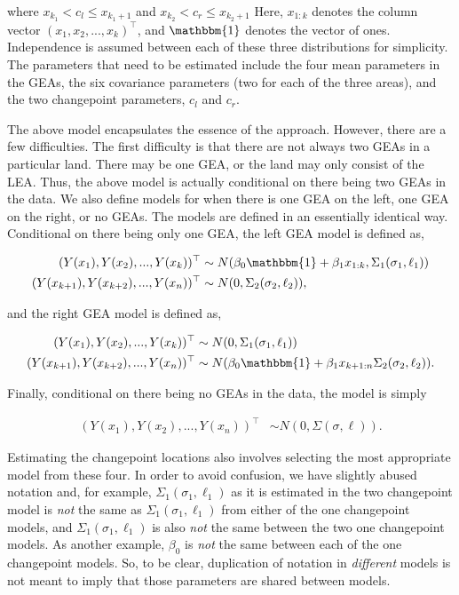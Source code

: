 \documentclass[12pt]{article}
\begin{document}
\noindent where \(x_{k_1} < c_l \leq x_{k_1 + 1}\) and
\(x_{k_2} < c_r \leq x_{k_2 + 1}\) Here, \(x_{1:k}\) denotes the column
vector \((x_1, x_2, ..., x_k)^\top\), and \(\mathbbm{1}\) denotes the
vector of ones. Independence is assumed between each of these three
distributions for simplicity. The parameters that need to be estimated
include the four mean parameters in the GEAs, the six covariance
parameters (two for each of the three areas), and the two changepoint
parameters, \(c_l\) and \(c_r\).

The above model encapsulates the essence of the approach. However, there
are a few difficulties. The first difficulty is that there are not
always two GEAs in a particular land. There may be one GEA, or the land
may only consist of the LEA. Thus, the above model is actually
conditional on there being two GEAs in the data. We also define models
for when there is one GEA on the left, one GEA on the right, or no GEAs.
The models are defined in an essentially identical way. Conditional on
there being only one GEA, the left GEA model is defined as,

\begin{align}
(Y(x_1), Y(x_2), ..., Y(x_{k}))^{\top} &\sim N(\beta_{0}\mathbbm{1} + \beta_{1} x_{1:k}, \Sigma_1(\sigma_1, \ell_1)) \\
(Y(x_{k + 1}), Y(x_{k + 2}), ..., Y(x_{n}))^{\top} &\sim N(0, \Sigma_2(\sigma_2, \ell_2)),
\end{align}

\noindent and the right GEA model is defined as,

\begin{align}
(Y(x_{1}), Y(x_{2}), ..., Y(x_{k}))^{\top} &\sim N(0, \Sigma_1(\sigma_1, \ell_1)) \\ 
(Y(x_{k + 1}), Y(x_{k + 2}), ..., Y(x_n))^{\top} &\sim N(\beta_{0}\mathbbm{1} + \beta_{1} x_{k + 1:n} \Sigma_2(\sigma_2, \ell_2)).
\end{align}

\noindent Finally, conditional on there being no GEAs in the data, the
model is simply

\begin{align}
(Y(x_{1}), Y(x_{2}), ..., Y(x_{n}))^{\top} &\sim N(0, \Sigma(\sigma, \ell)).
\end{align}

Estimating the changepoint locations also involves selecting the most
appropriate model from these four. In order to avoid confusion, we have
slightly abused notation and, for example,
\(\Sigma_1(\sigma_1, \ell_1)\) as it is estimated in the two changepoint
model is \emph{not} the same as \(\Sigma_1(\sigma_1, \ell_1)\) from
either of the one changepoint models, and \(\Sigma_1(\sigma_1, \ell_1)\)
is also \emph{not} the same between the two one changepoint models. As
another example, \(\beta_0\) is \emph{not} the same between each of the
one changepoint models. So, to be clear, duplication of notation in
\emph{different} models is not meant to imply that those parameters are
shared between models.
\end{document}
